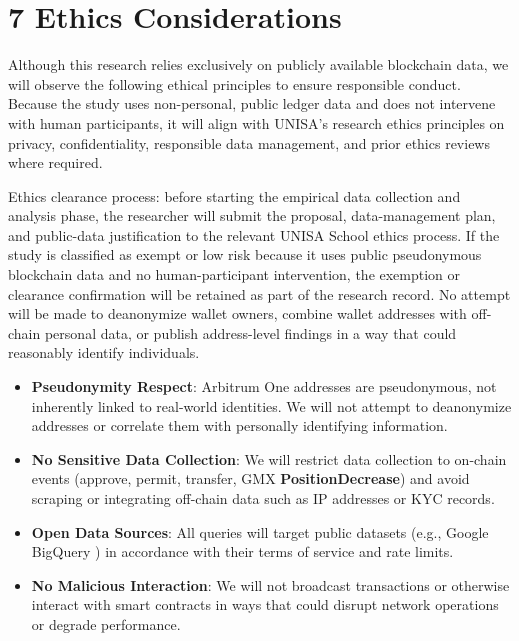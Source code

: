 \clearpage
{}
\section*{7 \textbf{Ethics Considerations}}
\label{sec:ethics-considerations}

Although this research relies exclusively on publicly available blockchain data, we will observe the following ethical principles to ensure responsible conduct. Because the study uses non-personal, public ledger data and does not intervene with human participants, it will align with UNISA's research ethics principles on privacy, confidentiality, responsible data management, and prior ethics reviews where required.


Ethics clearance process: before starting the empirical data collection and analysis phase, the researcher will submit the proposal, data-management plan, and public-data justification to the relevant UNISA School ethics process. If the study is classified as exempt or low risk because it uses public pseudonymous blockchain data and no human-participant intervention, the exemption or clearance confirmation will be retained as part of the research record. No attempt will be made to deanonymize wallet owners, combine wallet addresses with off-chain personal data, or publish address-level findings in a way that could reasonably identify individuals.



\begin{itemize}
\item[\textbullet] \textbf{Pseudonymity Respect}: Arbitrum One addresses are pseudonymous, not inherently linked to real-world identities. We will not attempt to deanonymize addresses or correlate them with personally identifying information.
\item[\textbullet] \textbf{No Sensitive Data Collection}: We will restrict data collection to on-chain events (approve, permit, transfer, GMX \textbf{PositionDecrease}) and avoid scraping or integrating off-chain data such as IP addresses or KYC records.
\end{itemize}

\begin{itemize}
\item[\textbullet] \textbf{Open Data Sources}: All queries will target public datasets (e.g., Google BigQuery ) in accordance with their terms of service and rate limits.
\item[\textbullet] \textbf{No Malicious Interaction}: We will not broadcast transactions or otherwise interact with smart contracts in ways that could disrupt network operations or degrade performance.
\end{itemize}

